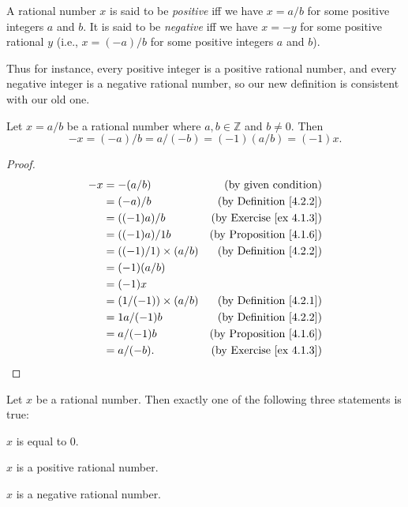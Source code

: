 \begin{definition}\label{4.2.6}
A rational number \(x\) is said to be \emph{positive} iff we have \(x = a / b\) for some positive integers \(a\) and \(b\).
It is said to be \emph{negative} iff we have \(x = -y\) for some positive rational \(y\)
(i.e., \(x = (-a) / b\) for some positive integers \(a\) and \(b\)).
\end{definition}

\begin{note}
Thus for instance, every positive integer is a positive rational number, and every negative integer is a negative rational number, so our new definition is consistent with our old one.
\end{note}

\begin{additional corollary}\label{ac 4.2.3}
Let \(x = a / b\) be a rational number where \(a, b \in \mathds{Z}\) and \(b \neq 0\).
Then
\[
    -x = (-a) / b = a / (-b) = (-1)(a / b) = (-1)x.
\]
\end{additional corollary}

\begin{proof}
\begin{align*}
-x &= -(a / b) & \text{(by given condition)} \\
&= (-a) / b & \text{(by Definition \ref{4.2.2})} \\
&= ((-1)a) / b & \text{(by Exercise \ref{ex 4.1.3})} \\
&= ((-1)a) / 1b & \text{(by Proposition \ref{4.1.6})} \\
&= ((-1) / 1) \times (a / b) & \text{(by Definition \ref{4.2.2})} \\
&= (-1)(a / b) \\
&= (-1)x \\
&= (1 / (-1)) \times (a / b) & \text{(by Definition \ref{4.2.1})} \\
&= 1a / (-1)b & \text{(by Definition \ref{4.2.2})} \\
&= a / (-1)b & \text{(by Proposition \ref{4.1.6})} \\
&= a / (-b). & \text{(by Exercise \ref{ex 4.1.3})}
\end{align*}
\end{proof}

\begin{lemma}\label{4.2.7}
Let \(x\) be a rational number.
Then exactly one of the following three statements is true:
\begin{enumerate*}
    \item \(x\) is equal to \(0\).
    \item \(x\) is a positive rational number.
    \item \(x\) is a negative rational number.
\end{enumerate*}
\end{lemma}

